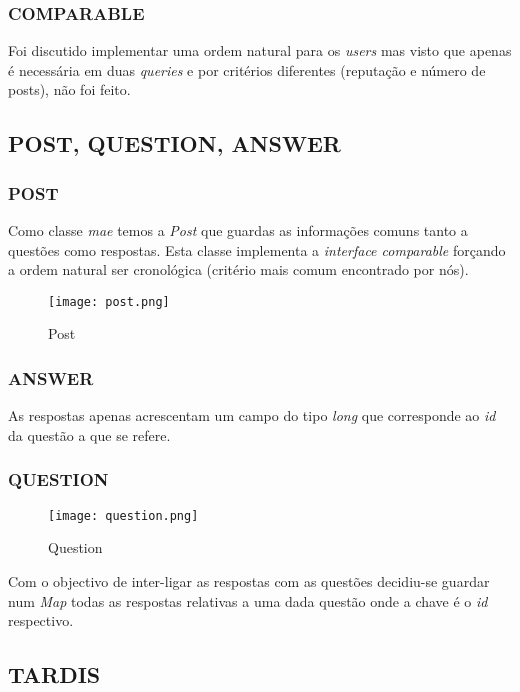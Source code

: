 \documentclass[letterpaper, 10 pt, conference]{IEEEtran} %
\begin{document}
\subsubsection{COMPARABLE}

Foi discutido implementar uma ordem natural para os \textit{users} mas visto que apenas é necessária em duas \textit{queries} e por critérios diferentes (reputação e número de posts), não foi feito.

\subsection{POST, QUESTION, ANSWER}

\subsubsection{POST}
Como classe \textit{mae} temos a \textit{Post} que guardas as informações comuns tanto a questões como respostas. Esta classe implementa a \textit{interface comparable} forçando a ordem natural ser cronológica (critério mais comum encontrado por nós).

\begin{figure}[h!]
  \centering
  \texttt{[image: post.png]}
   \caption{Post}
\end{figure}

\subsubsection{ANSWER}

As respostas apenas acrescentam um campo do tipo \textit{long} que corresponde ao \textit{id} da questão a que se refere.

\subsubsection{QUESTION}
\begin{figure}[h!]
  \centering
  \texttt{[image: question.png]}
   \caption{Question}
\end{figure}

Com o objectivo de inter-ligar as respostas com as questões decidiu-se guardar num \textit{Map} todas as respostas relativas a uma dada questão onde a chave é o \textit{id} respectivo.

\subsection{TARDIS}
\end{document}
